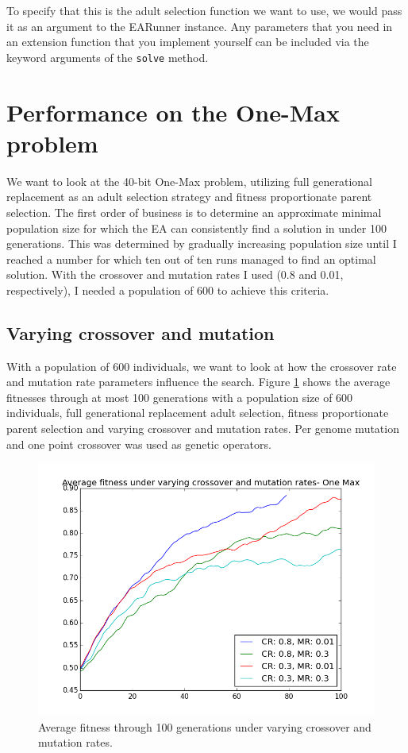 \documentclass[twoside]{article}
\begin{document}
\begin{multicols}{2}
    To specify that this is the adult selection function we want to use, we would pass it as an argument to the EARunner instance.
    Any parameters that you need in an extension function that you implement yourself can be included via the keyword arguments of the \texttt{solve} method.
    

    \section{Performance on the One-Max problem}

    We want to look at the 40-bit One-Max problem, utilizing full generational replacement as an adult selection strategy and fitness proportionate parent selection. 
    The first order of business is to determine an approximate minimal population size for which the EA can consistently find a solution in under 100 generations.
    This was determined by gradually increasing population size until I reached a number for which ten out of ten runs managed to find an optimal solution.
    With the crossover and mutation rates I used (0.8 and 0.01, respectively), I needed a population of 600 to achieve this criteria.

    \subsection{Varying crossover and mutation}

    With a population of 600 individuals, we want to look at how the crossover rate and mutation rate parameters influence the search.
    Figure \ref{fig:one-max-varying-cr-mr} shows the average fitnesses through at most 100 generations with a population size of 600 individuals, full generational replacement adult selection, fitness proportionate parent selection and varying crossover and mutation rates. 
    Per genome mutation and one point crossover was used as genetic operators.


    \begin{figure}[H]
        \centering
        \includegraphics[width=\linewidth]{images/one-max-varying-cr-mr.png}
        \caption{Average fitness through 100 generations under varying crossover and mutation rates.} \label{fig:one-max-varying-cr-mr}
    \end{figure}


\end{multicols}
\end{document}
